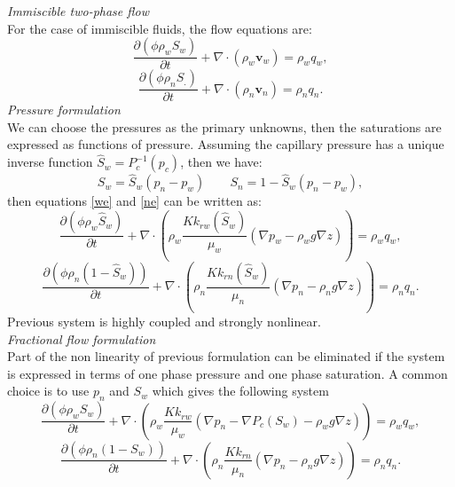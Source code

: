 \documentclass[12pt]{article}
\begin{document}
\emph{Immiscible two-phase flow}\\
For the case of immiscible fluids, the flow equations are:
\begin{equation}\label{we}
 \frac{\partial(\phi \rho_{w}S_{w})}{\partial t}+\nabla \cdot ( \rho_{w} \mathbf{v}_{w})=\rho_{w} q_{w},
\end{equation}
\begin{equation}\label{ne}
 \frac{\partial(\phi \rho_{n}S_{.})}{\partial t}+\nabla \cdot ( \rho_{n} \mathbf{v}_{n})=\rho_{n} q_{n}.
\end{equation}
\emph{Pressure formulation}\\
We can choose the pressures as the primary unknowns, then the saturations are expressed as functions of pressure. 
Assuming the capillary pressure has a unique inverse function $\hat{S}_w=P_c^{-1}(p_c)$, then we have:
$$S_w=\hat{S}_w(p_n-p_w)\qquad S_n=1-\hat{S}_w(p_n-p_w), $$
then equations \eqref{we} and \eqref{ne} can be written as:
\begin{equation}
 \frac{\partial(\phi \rho_{w}\hat{S}_{w})}{\partial t}+\nabla \cdot ( \rho_{w} \frac{{K}k_{rw}(\hat{S}_w)}{\mu_w}(\nabla p_w-\rho_w g \nabla z))=\rho_{w} q_{w},
\end{equation}
\begin{equation}
 \frac{\partial(\phi \rho_{n}(1-\hat{S}_{w}))}{\partial t}+\nabla \cdot ( \rho_{n} \frac{{K}k_{rn}(\hat{S}_w)}{\mu_n}(\nabla p_n-\rho_n g \nabla z))=\rho_{n} q_{n}.
\end{equation}
Previous system is highly coupled and strongly nonlinear. \\
\emph{Fractional flow formulation}\\
Part of the non linearity of previous formulation can be eliminated if the system is expressed in terms of one phase pressure and one phase saturation. A common choice is to use $p_n$ and $S_w$ which gives the following system
\begin{equation}
 \frac{\partial(\phi \rho_{w}{S}_{w})}{\partial t}+\nabla \cdot ( \rho_{w} \frac{{K}k_{rw}}{\mu_w}(\nabla p_n-\nabla P_c(S_w)-\rho_w g \nabla z))=\rho_{w} q_{w},
\end{equation}
\begin{equation}
 \frac{\partial(\phi \rho_{n}(1-{S}_{w}))}{\partial t}+\nabla \cdot ( \rho_{n} \frac{{K}k_{rn}}{\mu_n}(\nabla p_n-\rho_n g \nabla z))=\rho_{n} q_{n}.
\end{equation}
\end{document}
